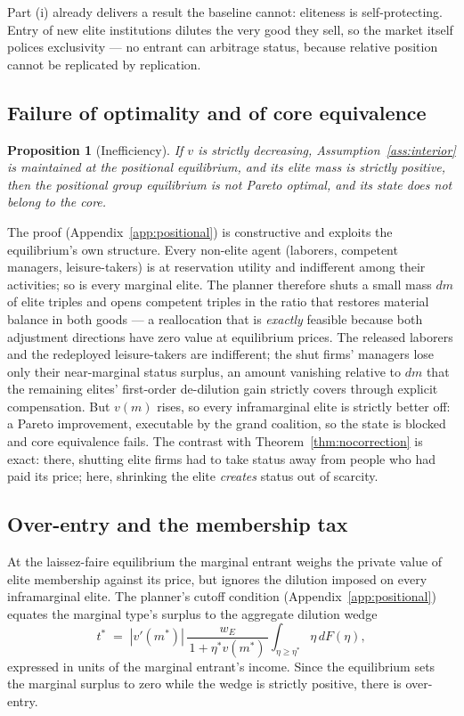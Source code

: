 \documentclass[12pt,letterpaper]{article}
\newtheorem{proposition}{Proposition}
\theoremstyle{definition}
\begin{document}
Part (i) already delivers a result the baseline cannot: eliteness is self-protecting.
Entry of new elite institutions dilutes the very good they sell, so the market itself polices exclusivity --- no entrant can arbitrage status, because relative position cannot be replicated by replication.

\subsection{Failure of optimality and of core equivalence}

\begin{proposition}[Inefficiency]\label{prop:inefficiency} If $v$ is strictly decreasing, Assumption~\ref{ass:interior} is maintained at the positional equilibrium, and its elite mass is strictly positive, then the positional group equilibrium is not Pareto optimal, and its state does not belong to the core.
\end{proposition}

The proof (Appendix~\ref{app:positional}) is constructive and exploits the equilibrium's own structure.
Every non-elite agent (laborers, competent managers, leisure-takers) is at reservation utility and indifferent among their activities; so is every marginal elite.
The planner therefore shuts a small mass $dm$ of elite triples and opens competent triples in the ratio that restores material balance in both goods --- a reallocation that is \emph{exactly} feasible because both adjustment directions have zero value at equilibrium prices.
The released laborers and the redeployed leisure-takers are indifferent; the shut firms' managers lose only their near-marginal status surplus, an amount vanishing relative to $dm$ that the remaining elites' first-order de-dilution gain strictly covers through explicit compensation.
But $v(m)$ rises, so every inframarginal elite is strictly better off: a Pareto improvement, executable by the grand coalition, so the state is blocked and core equivalence fails.
The contrast with Theorem~\ref{thm:nocorrection} is exact: there, shutting elite firms had to take status away from people who had paid its price; here, shrinking the elite \emph{creates} status out of scarcity.

\subsection{Over-entry and the membership tax}

At the laissez-faire equilibrium the marginal entrant weighs the private value of elite membership against its price, but ignores the dilution imposed on every inframarginal elite.
The planner's cutoff condition (Appendix~\ref{app:positional}) equates the marginal type's surplus to the aggregate dilution wedge
\begin{equation}\label{eq:wedge}
  t^\ast \;=\; \left|v'(m^\ast)\right|\, \frac{w_E}{\,1+\eta^\ast v(m^\ast)\,}
  \int_{\eta\geq\eta^\ast}\!\! \eta\, dF(\eta),
\end{equation}
expressed in units of the marginal entrant's income.
Since the equilibrium sets the marginal surplus to zero while the wedge is strictly positive, there is over-entry.
\end{document}
